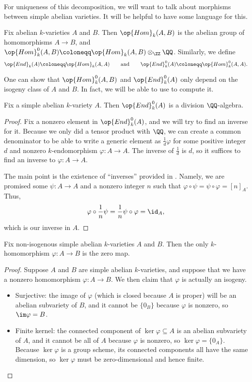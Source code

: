 \documentclass[../notes.tex]{subfiles}
\begin{document}
For uniqueness of this decomposition, we will want to talk about morphisms between simple abelian varieties. It will be helpful to have some language for this.
\begin{definition}
	Fix abelian $k$-varieties $A$ and $B$. Then $\op{Hom}_k(A,B)$ is the abelian group of homomorphisms $A\to B$, and $\op{Hom}_k^0(A,B)\coloneqq\op{Hom}_k(A,B)\otimes_\ZZ\QQ$. Similarly, we define
	\[\op{End}_k(A)\coloneqq\op{Hom}_k(A,A)\qquad\text{and}\qquad\op{End}^0_k(A)\coloneqq\op{Hom}_k^0(A,A).\]
\end{definition}
One can show that $\op{Hom}^0_k(A,B)$ and $\op{End}^0_k(A)$ only depend on the isogeny class of $A$ and $B$. In fact, we will be able to use  to compute it.
\begin{corollary} \label{cor:end-a}
	Fix a simple abelian $k$-variety $A$. Then $\op{End}^0_k(A)$ is a division $\QQ$-algebra.
\end{corollary}
\begin{proof}
	Fix a nonzero element in $\op{End}^0_k(A)$, and we will try to find an inverse for it. Because we only did a tensor product with $\QQ$, we can create a common denominator to be able to write a generic element as $\frac1d\varphi$ for some positive integer $d$ and nonzero $k$-endomorphism $\varphi\colon A\to A$. The inverse of $\frac1d$ is $d$, so it suffices to find an inverse to $\varphi\colon A\to A$.

	The main point is the existence of ``inverses'' provided in . Namely, we are promised some $\psi\colon A\to A$ and a nonzero integer $n$ such that $\varphi\circ\psi=\psi\circ\varphi=[n]_A$. Thus,
	\[\varphi\circ\frac1n\psi=\frac1n\psi\circ\varphi=\id_A,\]
	which is our inverse in $A$.
\end{proof}
\begin{corollary} \label{cor:simple-homs}
	Fix non-isogenous simple abelian $k$-varieties $A$ and $B$. Then the only $k$-homomorphism $\varphi\colon A\to B$ is the zero map.
\end{corollary}
\begin{proof}
	Suppose $A$ and $B$ are simple abelian $k$-varieties, and suppose that we have a nonzero homomorphism $\varphi\colon A\to B$. We then claim that $\varphi$ is actually an isogeny.
	\begin{itemize}
		\item Surjective: the image of $\varphi$ (which is closed because $A$ is proper) will be an abelian subvariety of $B$, and it cannot be $\{0_B\}$ because $\varphi$ is nonzero, so $\im\varphi=B$.
		\item Finite kernel: the connected component of $\ker\varphi\subseteq A$ is an abelian subvariety of $A$, and it cannot be all of $A$ because $\varphi$ is nonzero, so $\ker\varphi=\{0_A\}$. Because $\ker\varphi$ is a group scheme, its connected components all have the same dimension, so $\ker\varphi$ must be zero-dimensional and hence finite.
		\qedhere
	\end{itemize}
\end{proof}
\end{document}

